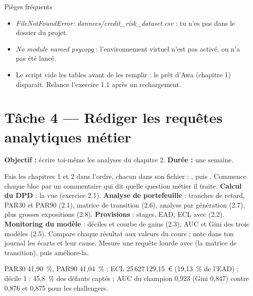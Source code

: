 \begin{piege}{Pièges fréquents}
\begin{itemize}
\item \emph{FileNotFoundError: donnees/credit\_risk\_dataset.csv} : tu n'es pas dans le dossier du projet.
\item \emph{No module named psycopg} : l'environnement virtuel n'est pas activé, ou
 n'a pas été lancé.
\item Le script vide les tables avant de les remplir : le prêt d'Awa (chapitre 1) disparaît. Relance
l'exercice 1.1 après un rechargement.
\end{itemize}
\end{piege}

\section{Tâche 4 --- Rédiger les requêtes analytiques métier}

\textbf{Objectif :} écrire toi-même les analyses du chapitre 2. \textbf{Durée :} une semaine.

\begin{itemize}[label={}, leftmargin=1.2em]
\tache Fais les chapitres 1 et 2 dans l'ordre, chacun dans son fichier :
, puis . Commence chaque bloc par un commentaire
qui dit quelle question métier il traite.
\tache \textbf{Calcul du DPD} : la vue  (exercice 2.1).
\tache \textbf{Analyse de portefeuille} : tranches de retard, PAR30 et PAR90 (2.1), matrice de transition
(2.6), analyse par génération (2.7), plus grosses expositions (2.8).
\tache \textbf{Provisions} : stages, EAD, ECL avec  (2.2).
\tache \textbf{Monitoring du modèle} : déciles et courbe de gains (2.3), AUC et Gini des trois modèles (2.5).
\tache Compare chaque résultat aux valeurs du cours ; note dans ton journal les écarts et leur cause.
\tache Mesure une requête lourde avec  (la matrice de transition), puis améliore-la.
\end{itemize}

\begin{resultat}
PAR30 41,90~\%, PAR90 41,04~\% ; ECL 25\,627\,129,15~€ (19,13~\% de l'EAD) ; décile 1 : 45,8~\% des
défauts captés ; AUC du champion 0,923 (Gini 0,847) contre 0,876 et 0,875 pour les challengers.
\end{resultat}

